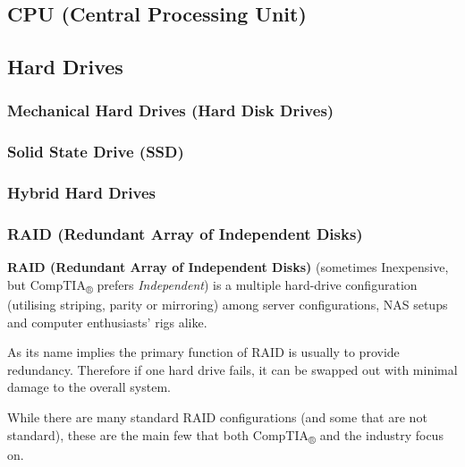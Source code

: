 \documentclass{article}
\begin{document}
\subsection{CPU (Central Processing Unit)}

\subsection{Hard Drives}

\subsubsection{Mechanical Hard Drives (Hard Disk Drives)}

\subsubsection{Solid State Drive (SSD)}

\subsubsection{Hybrid Hard Drives}

\subsubsection{RAID (Redundant Array of Independent Disks)}

\textbf{RAID (Redundant Array of Independent Disks)} (sometimes Inexpensive, but CompTIA\textsubscript{®} prefers \textit{Independent}) is a multiple hard-drive configuration (utilising striping, parity or mirroring) among server configurations, NAS setups and computer enthusiasts' rigs alike.

As its name implies the primary function of RAID is usually to provide redundancy. Therefore if one hard drive fails, it can be swapped out with minimal damage to the overall system.

While there are many standard RAID configurations (and some that are not standard), these are the main few that both CompTIA\textsubscript{®} and the industry focus on.
\end{document}
